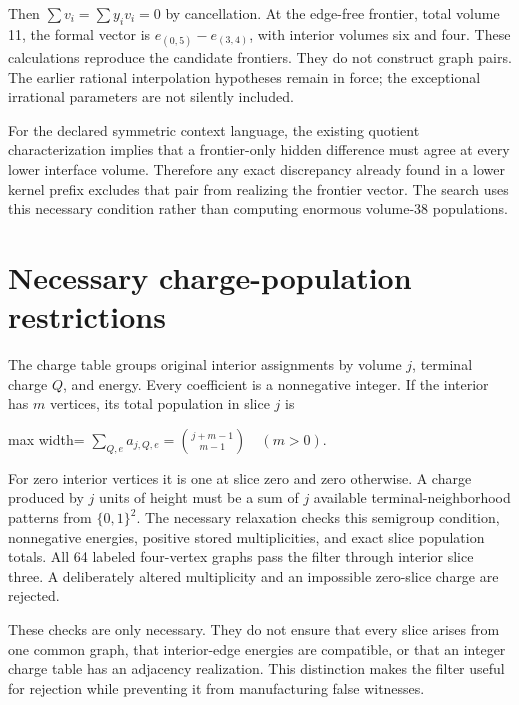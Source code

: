 \documentclass[
  11pt,
  a4paper,
]{report}
\begin{document}
Then \(\sum v_i=\sum y_iv_i=0\) by cancellation. At the edge-free
frontier, total volume 11, the formal vector is \(e_{(0,5)}-e_{(3,4)}\),
with interior volumes six and four. These calculations reproduce the
candidate frontiers. They do not construct graph pairs. The earlier
rational interpolation hypotheses remain in force; the exceptional
irrational parameters are not silently included.

For the declared symmetric context language, the existing quotient
characterization implies that a frontier-only hidden difference must
agree at every lower interface volume. Therefore any exact discrepancy
already found in a lower kernel prefix excludes that pair from realizing
the frontier vector. The search uses this necessary condition rather
than computing enormous volume-38 populations.

\hypertarget{necessary-charge-population-restrictions}{%
\section{Necessary charge-population
restrictions}\label{necessary-charge-population-restrictions}}

The charge table groups original interior assignments by volume \(j\),
terminal charge \(Q\), and energy. Every coefficient is a nonnegative
integer. If the interior has \(m\) vertices, its total population in
slice \(j\) is

\begin{center}
\begin{adjustbox}{max width=\linewidth}
$\displaystyle
 \sum_{Q,e}a_{j,Q,e}=\binom{j+m-1}{m-1}\quad(m>0).
$
\end{adjustbox}
\end{center}

For zero interior vertices it is one at slice zero and zero otherwise. A
charge produced by \(j\) units of height must be a sum of \(j\)
available terminal-neighborhood patterns from \(\{0,1\}^2\). The
necessary relaxation checks this semigroup condition, nonnegative
energies, positive stored multiplicities, and exact slice population
totals. All 64 labeled four-vertex graphs pass the filter through
interior slice three. A deliberately altered multiplicity and an
impossible zero-slice charge are rejected.

These checks are only necessary. They do not ensure that every slice
arises from one common graph, that interior-edge energies are
compatible, or that an integer charge table has an adjacency
realization. This distinction makes the filter useful for rejection
while preventing it from manufacturing false witnesses.
\end{document}
